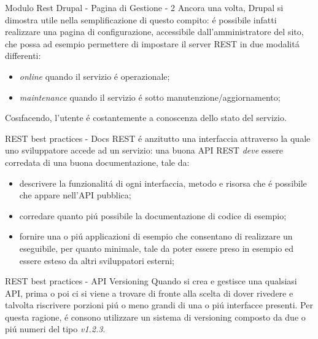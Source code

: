 \documentclass{beamer}
\begin{document}
\begin{frame}{Modulo Rest Drupal - Pagina di Gestione - 2}
Ancora una volta, Drupal si dimostra utile nella semplificazione di questo compito: \'e possibile infatti realizzare una pagina di
configurazione, accessibile dall'amministratore del sito, che possa ad esempio permettere di impostare il server REST in due
modalit\'a differenti:
\begin{itemize}
\item \emph{online} quando il servizio \'e operazionale;
\item \emph{maintenance} quando il servizio \'e sotto manutenzione/aggiornamento;
\end{itemize}
Cos\i facendo, l'utente \'e costantemente a conoscenza dello stato del servizio.
\end{frame}


\begin{frame}{REST best practices - Docs}
REST \'e anzitutto una interfaccia attraverso la quale uno sviluppatore accede ad un servizio: una buona API REST \emph{deve} essere corredata di una buona documentazione, tale da:
\begin{itemize}
\item descrivere la funzionalit\'a di ogni interfaccia, metodo e risorsa che \'e possibile che appare nell'API pubblica;
\item corredare quanto pi\'u possibile la documentazione di codice di esempio;
\item fornire una o pi\'u applicazioni di esempio che consentano di realizzare un eseguibile, per quanto minimale, tale da poter essere preso in esempio ed essere esteso da altri sviluppatori esterni;
\end{itemize}
\end{frame}

\begin{frame}{REST best practices - API Versioning}
Quando si crea e gestisce una qualsiasi API, prima o poi ci si viene a trovare di fronte alla scelta di dover rivedere e talvolta riscrivere porzioni pi\'u o meno grandi di una o pi\'u interfacce presenti. Per questa ragione, \'e consono utilizzare un sistema di versioning composto da due o pi\'u numeri del tipo \emph{v1.2.3}.
\end{frame}
\end{document}
